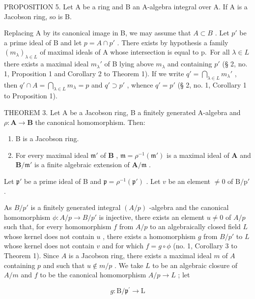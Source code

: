 PROPOSITION 5. Let A be a ring and B an A-algebra integral over A. If A is a Jacobson ring, so is B.

Replacing A by its canonical image in B, we may assume that \(A \subset B\) . Let \(p'\) be a prime ideal of B and let \(p = A \cap p'\) . There exists by hypothesis a family \((m_{\lambda})_{\lambda \in L}\) of maximal ideals of A whose intersection is equal to p.~For all \(\lambda \in L\) there exists a maximal ideal \(m_{\lambda}'\) of B lying above \(m_{\lambda}\) and containing \(p'\) (§ 2, no. 1, Proposition 1 and Corollary 2 to Theorem 1). If we write \(q' = \bigcap_{\lambda \in L} m_{\lambda}'\) , then \(q' \cap A = \bigcap_{\lambda \in L} m_{\lambda} = p\) and \(q' \supset p'\) , whence \(q' = p'\) (§ 2, no. 1, Corollary 1 to Proposition 1).

THEOREM 3. Let A be a Jacobson ring, B a finitely generated A-algebra and \(\rho: \mathbf{A} \to \mathbf{B}\) the canonical homomorphism. Then:

\begin{enumerate}
\def\labelenumi{(\roman{enumi})}
\item
  B is a Jacobson ring.
\item
  For every maximal ideal \(\mathfrak{m}'\) of \(\mathbf{B}\) , \(\mathfrak{m} = \rho^{-1} (\mathfrak{m}')\) is a maximal ideal of \(\mathbf{A}\) and \(\mathbf{B} / \mathfrak{m}'\) is a finite algebraic extension of \(\mathbf{A} / \mathfrak{m}\) .
\end{enumerate}

Let \(\mathfrak{p}'\) be a prime ideal of B and \(\mathfrak{p} = \rho^{-1} (\mathfrak{p}')\) . Let \(v\) be an element \(\neq 0\) of \(\mathrm{B / p'}\) .

As \(B/p'\) is a finitely generated integral \((A/p)\) -algebra and the canonical homomorphism \(\phi: A/p \to B/p'\) is injective, there exists an element \(u \neq 0\) of \(A/p\) such that, for every homomorphism \(f\) from \(A/p\) to an algebraically closed field \(L\) whose kernel does not contain \(u\) , there exists a homomorphism \(g\) from \(B/p'\) to \(L\) whose kernel does not contain \(v\) and for which \(f = g \circ \phi\) (no. 1, Corollary 3 to Theorem 1). Since \(A\) is a Jacobson ring, there exists a maximal ideal \(m\) of \(A\) containing \(p\) and such that \(u \notin m/p\) . We take \(L\) to be an algebraic closure of \(A/m\) and \(f\) to be the canonical homomorphism \(A/p \to L\) ; let

\[
g \colon \mathrm{B} / \mathfrak {p} ^ {\prime} \rightarrow \mathrm{L}
\]

